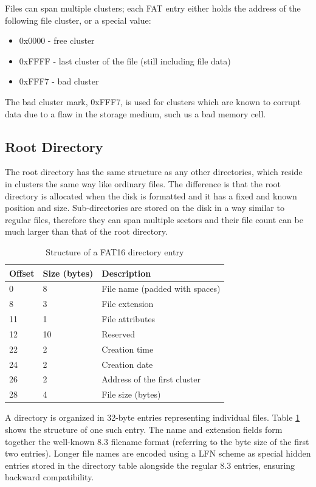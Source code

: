 Files can span multiple clusters; each \gls{FAT} entry either holds the address of the following file cluster, or a special value:

\begin{itemize}[nosep]
	\item 0x0000 - free cluster
	\item 0xFFFF - last cluster of the file (still including file data)
	\item 0xFFF7 - bad cluster
\end{itemize}

The bad cluster mark, 0xFFF7, is used for clusters which are known to corrupt data due to a flaw in the storage medium, such us a bad memory cell.

\subsection{Root Directory}

The root directory has the same structure as any other directories, which reside in clusters the same way like ordinary files. The difference is that the root directory is allocated when the disk is formatted and it has a fixed and known position and size. Sub-directories are stored on the disk in a way similar to regular files, therefore they can span multiple sectors and their file count can be much larger than that of the root directory.

\begin{table}
	\centering
	\begin{tabular}{lll}
		\toprule
		\textbf{Offset} & \textbf{Size (bytes)}  & \textbf{Description}\\
		\midrule
		0 & 8 & File name (padded with spaces) \\
		8 & 3 & File extension \\
		11 & 1 & File attributes \\
		12 & 10 & Reserved \\
		22 & 2 & Creation time \\
		24 & 2 & Creation date \\
		26 & 2 & Address of the first cluster \\
		28 & 4 & File size (bytes) \\
		\bottomrule
	\end{tabular}
	\caption{\label{tab:fat16-dir-entry}Structure of a FAT16 directory entry}
\end{table}

A directory is organized in 32-byte entries representing individual files. Table \ref{tab:fat16-dir-entry} shows the structure of one such entry. The name and extension fields form together the well-known 8.3 filename format (referring to the byte size of the first two entries). Longer file names are encoded using a \gls{LFN} scheme \cite{fat-lfn} as special hidden entries stored in the directory table alongside the regular 8.3 entries, ensuring backward compatibility.


